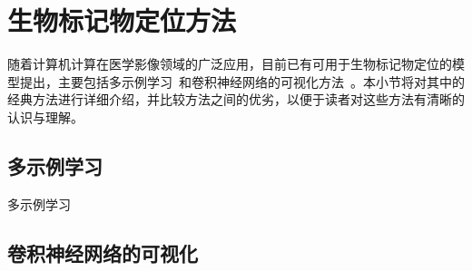 \section{生物标记物定位方法}
随着计算机计算在医学影像领域的广泛应用，目前已有可用于生物标记物定位的模型提出，主要包括多示例学习~\cite{maron1998framework}和卷积神经网络的可视化方法~\cite{zhou2016learning, selvaraju2017grad}。本小节将对其中的经典方法进行详细介绍，并比较方法之间的优劣，以便于读者对这些方法有清晰的认识与理解。
\subsection{多示例学习}
多示例学习~\cite{maron1998framework}
\subsection{卷积神经网络的可视化}\label{subsec:visulization_methods}
